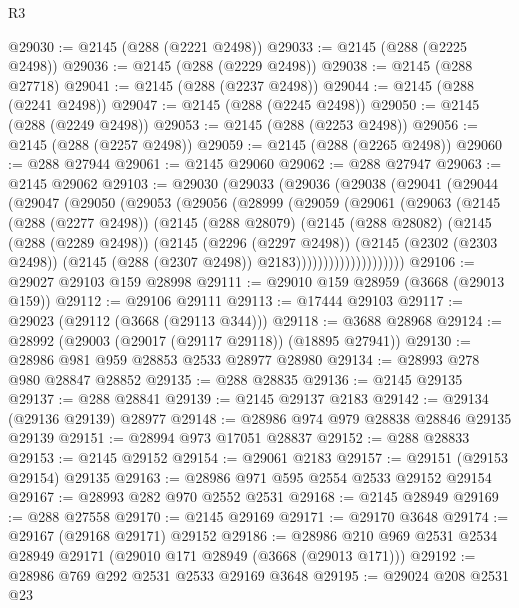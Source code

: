 \begin{lexlean}{R3}
\begin{coremodule}
@29030 := @2145 (@288 (@2221 @2498))
@29033 := @2145 (@288 (@2225 @2498))
@29036 := @2145 (@288 (@2229 @2498))
@29038 := @2145 (@288 @27718)
@29041 := @2145 (@288 (@2237 @2498))
@29044 := @2145 (@288 (@2241 @2498))
@29047 := @2145 (@288 (@2245 @2498))
@29050 := @2145 (@288 (@2249 @2498))
@29053 := @2145 (@288 (@2253 @2498))
@29056 := @2145 (@288 (@2257 @2498))
@29059 := @2145 (@288 (@2265 @2498))
@29060 := @288 @27944
@29061 := @2145 @29060
@29062 := @288 @27947
@29063 := @2145 @29062
@29103 := @29030
    (@29033
      (@29036
        (@29038
          (@29041
            (@29044
              (@29047
                (@29050
                  (@29053
                    (@29056
                      (@28999
                        (@29059
                          (@29061
                            (@29063
                              (@2145
                                (@288 (@2277 @2498))
                                (@2145
                                  (@288 @28079)
                                  (@2145
                                    (@288 @28082)
                                    (@2145
                                      (@288 (@2289 @2498))
                                      (@2145
                                        (@2296 (@2297 @2498))
                                        (@2145
                                          (@2302 (@2303 @2498))
                                          (@2145 (@288 (@2307 @2498)) @2183))))))))))))))))))))
@29106 := @29027 @29103 @159 @28998
@29111 := @29010 @159 @28959 (@3668 (@29013 @159))
@29112 := @29106 @29111
@29113 := @17444 @29103
@29117 := @29023 (@29112 (@3668 (@29113 @344)))
@29118 := @3688 @28968
@29124 := @28992 (@29003 (@29017 (@29117 @29118)) (@18895 @27941))
@29130 := @28986 @981 @959 @28853 @2533 @28977 @28980
@29134 := @28993 @278 @980 @28847 @28852
@29135 := @288 @28835
@29136 := @2145 @29135
@29137 := @288 @28841
@29139 := @2145 @29137 @2183
@29142 := @29134 (@29136 @29139) @28977
@29148 := @28986 @974 @979 @28838 @28846 @29135 @29139
@29151 := @28994 @973 @17051 @28837
@29152 := @288 @28833
@29153 := @2145 @29152
@29154 := @29061 @2183
@29157 := @29151 (@29153 @29154) @29135
@29163 := @28986 @971 @595 @2554 @2533 @29152 @29154
@29167 := @28993 @282 @970 @2552 @2531
@29168 := @2145 @28949
@29169 := @288 @27558
@29170 := @2145 @29169
@29171 := @29170 @3648
@29174 := @29167 (@29168 @29171) @29152
@29186 := @28986 @210 @969 @2531 @2534 @28949 @29171 (@29010 @171 @28949 (@3668 (@29013 @171)))
@29192 := @28986 @769 @292 @2531 @2533 @29169 @3648
@29195 := @29024 @208 @2531 @23

\end{coremodule}
\end{lexlean}
